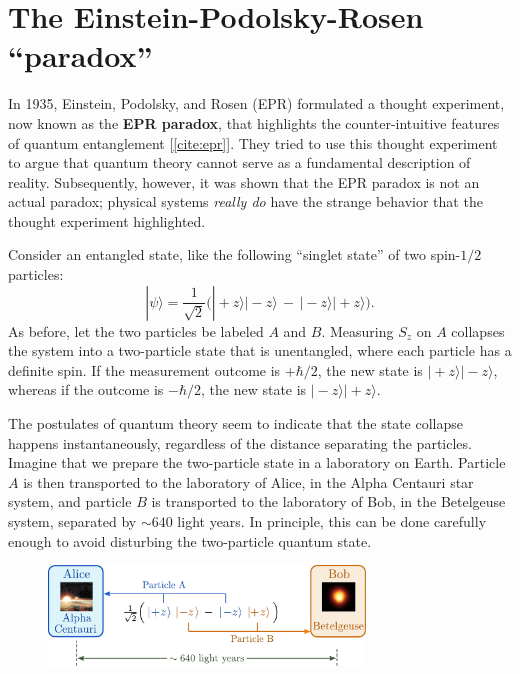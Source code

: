 \documentclass[pra,12pt]{revtex4-2}
\begin{document}
\section{The Einstein-Podolsky-Rosen ``paradox''}

In 1935, Einstein, Podolsky, and Rosen (EPR) formulated a thought
experiment, now known as the \textbf{EPR paradox}, that highlights the
counter-intuitive features of quantum entanglement [\ref{cite:epr}].
They tried to use this thought experiment to argue that quantum theory
cannot serve as a fundamental description of reality.  Subsequently,
however, it was shown that the EPR paradox is not an actual paradox;
physical systems \textit{really do} have the strange behavior that the
thought experiment highlighted.

Consider an entangled state, like the following ``singlet state'' of
two spin-$1/2$ particles:
\begin{equation}
  |\psi\rangle = \frac{1}{\sqrt{2}} \Big(|\!+\!z\rangle|\!-\!z\rangle \,-\, |\!-\!z\rangle|\!+\!z\rangle\Big).
  \label{eprsinglet}
\end{equation}
As before, let the two particles be labeled $A$ and $B$.  Measuring
$S_z$ on $A$ collapses the system into a two-particle state that is
unentangled, where each particle has a definite spin.  If the
measurement outcome is $+\hbar/2$, the new state is $|\!+\!z\rangle
|\!-\!z\rangle$, whereas if the outcome is $-\hbar/2$, the new state
is $|\!-\!z\rangle|\!+\!z\rangle$.

The postulates of quantum theory seem to indicate that the state
collapse happens instantaneously, regardless of the distance
separating the particles.  Imagine that we prepare the two-particle
state in a laboratory on Earth.  Particle $A$ is then transported to
the laboratory of Alice, in the Alpha Centauri star system, and
particle $B$ is transported to the laboratory of Bob, in the
Betelgeuse system, separated by $\sim 640$ light years.  In principle,
this can be done carefully enough to avoid disturbing the two-particle
quantum state.

\begin{figure}[h]
  \centering\includegraphics[width=0.75\textwidth]{epr}
\end{figure}
\end{document}
